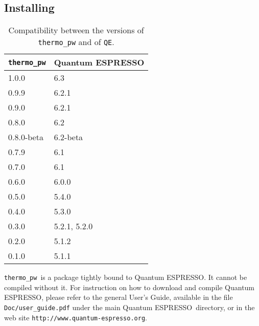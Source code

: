 \documentclass[12pt,a4paper]{article}
\def\qe{{\sc Quantum ESPRESSO}}
\def\thermo{\texttt{thermo\_pw}}
\begin{document}
\subsection{\color{web-blue}Installing}
\begin{table}
\begin{center}
\begin{tabular}{ll}
\hline
\hline
\texttt{thermo\_pw} & \qe  \\
\hline
1.0.0 & 6.3 \\
0.9.9 & 6.2.1 \\
0.9.0 & 6.2.1 \\
0.8.0 & 6.2 \\
0.8.0-beta & 6.2-beta \\
0.7.9 & 6.1 \\
0.7.0 & 6.1 \\
0.6.0 & 6.0.0 \\
0.5.0 & 5.4.0 \\
0.4.0 & 5.3.0 \\
0.3.0 & 5.2.1, 5.2.0 \\
0.2.0 & 5.1.2 \\
0.1.0 & 5.1.1 \\
\hline
\hline
\end{tabular}
\caption{Compatibility between the versions of 
\texttt{thermo\_pw} and of \texttt{QE}.}
\end{center}
\end{table}

\thermo\ is a package tightly bound to \qe. It cannot be compiled without
it. For instruction on how to download and compile \qe, please 
refer to the general User's Guide, available in the file \texttt{Doc/user\_guide.pdf}
under the main \qe\ directory, or in the web site 
\texttt{http://www.quantum-espresso.org}.
\end{document}
